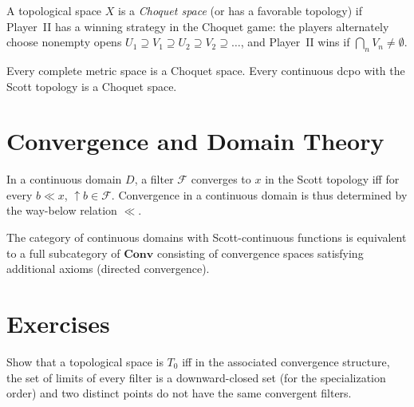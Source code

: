 \begin{definition}
A topological space $X$ is a \emph{Choquet space} (or has a favorable topology) if Player~II
has a winning strategy in the Choquet game: the players alternately choose nonempty opens
$U_1 \supseteq V_1 \supseteq U_2 \supseteq V_2 \supseteq \ldots$, and Player~II wins if
$\bigcap_n V_n \neq \emptyset$.
\end{definition}

\begin{theorem}
Every complete metric space is a Choquet space. Every continuous dcpo with the Scott
topology is a Choquet space.
\end{theorem}

\section{Convergence and Domain Theory}

\begin{proposition}
In a continuous domain $D$, a filter $\mathcal{F}$ converges to $x$ in the Scott topology
iff for every $b \ll x$, $\uparrow\! b \in \mathcal{F}$. Convergence in a continuous
domain is thus determined by the way-below relation $\ll$.
\end{proposition}

\begin{theorem}
The category of continuous domains with Scott-continuous functions is equivalent to a full
subcategory of $\mathbf{Conv}$ consisting of convergence spaces satisfying additional
axioms (directed convergence).
\end{theorem}

\section{Exercises}

\begin{exercise}
Show that a topological space is $T_0$ iff in the associated convergence structure, the
set of limits of every filter is a downward-closed set (for the specialization order) and
two distinct points do not have the same convergent filters.
\end{exercise}

